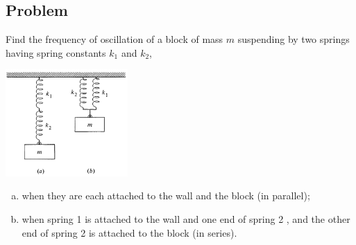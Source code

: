 \documentclass[solutions]{esg8012pset}
\begin{document}
\subsection*{Problem}
  Find the frequency of oscillation of a block of mass $m$ suspending by two springs having spring constants $k_1$ and $k_2$,
  \begin{center}\includegraphics[width=0.35\textwidth]{ps03_4}\end{center}
  \begin{enumerate}[a)]
    \item when they are each attached to the wall and the block (in parallel);
    \item when spring 1 is attached to the wall and one end of spring 2 , and the other end of spring 2 is attached to the block (in series).
  \end{enumerate}
\end{document}
